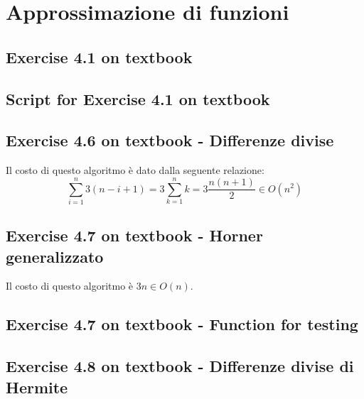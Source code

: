 \section{Approssimazione di funzioni}

\subsection{Exercise 4.1 on textbook}
\label{subsec:exercise41}
 

\subsection{Script for Exercise 4.1 on textbook}
\label{subsec:scriptForExercise41}


\subsection{Exercise 4.6 on textbook - Differenze divise}
\label{subsec:differenzeDiviseEngineCode}

Il costo di questo algoritmo \`e dato dalla seguente relazione:
\begin{displaymath}
\sum_{i = 1}^{n}{3(n-i+1)} = 3\sum_{k = 1}^{n}{k} = 3\frac{n(n+1)}{2} \in
O(n^{2})
\end{displaymath}

\subsection{Exercise 4.7 on textbook - Horner generalizzato}
\label{subsec:HornerGeneralizzato}
  
Il costo di questo algoritmo \`e $3n \in O(n)$.

\subsection{Exercise 4.7 on textbook - Function for testing}
\label{subsec:exercise47testing}
 

\subsection{Exercise 4.8 on textbook - Differenze divise di Hermite}
\label{subsec:hermiteDifferenzeDiviseEngineCode}



